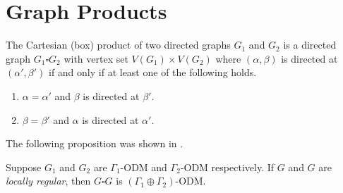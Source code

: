 \section{Graph Products}

\begin{definition}
The Cartesian (box) product of two directed graphs \(G_1\) and \(G_2\) is a directed graph \(G_1 \square G_2\)
with vertex set \(V(G_1) \times V(G_2)\) where
\((\alpha, \beta)\) is directed at \((\alpha',\beta')\) if and only if at least one of the following holds.
\begin{enumerate}
    \item \(\alpha = \alpha'\) and \(\beta\) is directed at \(\beta'\).
    \item \(\beta = \beta'\) and \(\alpha\) is directed at \(\alpha'\).
\end{enumerate}
\end{definition}

The following proposition was shown in \cite{dengGroupDistanceMagic2025}.
\begin{proposition}
    \label{prop:cartesian}
Suppose \(G_1\) and \(G_2\) are \(\Gamma_1\)-ODM and \(\Gamma_2\)-ODM respectively.
If \(G\) and \(G\) are \textit{locally regular},
then \(G \square G\) is \((\Gamma_1 \oplus \Gamma_2)\)-ODM.
\end{proposition}

